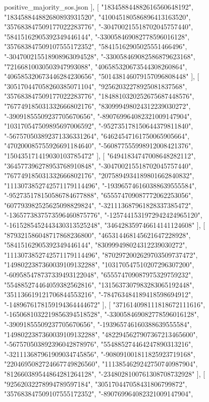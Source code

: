 \begin{filecontents*}[overwrite]{positive_majority_sos.json}
   ],
   [
    "183458844882616560648192",
    "183458844882680893931520",
    "410045180586896413163520",
    "357683847509177022283776",
    "-304700215518702045757440",
    "58415162905392349446144",
    "-330058469082778596016128",
    "357683847509107555172352",
    "58415162905025551466496",
    "-304700215518908963094528",
    "-330058469082586879623168",
    "72166810030503947993088",
    "406585320673544308260864",
    "406585320673446284230656",
    "501438146079157096808448"
   ],
   [
    "305170447058260385071104",
    "92562032278925081837568",
    "357683847509177022283776",
    "1848810320252675687448576",
    "767749185031332666802176",
    "830999498024312239030272",
    "-39091855509237705670656",
    "-890769964082321009147904",
    "103170547509895697006592",
    "-952735178150644379811840",
    "-567570503892371336331264",
    "64624547161750065905664",
    "470200085755926691184640",
    "-560877555998912008421376",
    "150435171419030103785472"
   ],
   [
    "64941834747008648282112",
    "364577396278953768910848",
    "-304700215518702045757440",
    "767749185031332666802176",
    "2075894934189801662840832",
    "1113073852742571179114496",
    "-193965746160388639555584",
    "-952735178150586784677888",
    "655574709087772062253056",
    "607793982525625098829824",
    "-321113687961828337385472",
    "-1365773837573596460875776",
    "-1257441531972942424965120",
    "-1615285452443430313525248",
    "346428359746614141124608"
   ],
   [
    "879321586048717868236800",
    "465314468145621647228928",
    "58415162905392349446144",
    "830999498024312239030272",
    "1113073852742571179114496",
    "8702972002629703509737472",
    "1498022387360039109132288",
    "103170547510207296307200",
    "-609585478737339493122048",
    "655574709087975329759232",
    "554885274464059382562816",
    "1315637307983283065192448",
    "351136619121706844553216",
    "-784763484189418598694912",
    "-1489676178159194364444672"
   ],
   [
    "371614098111818672111616",
    "-1650681032219856394518528",
    "-330058469082778596016128",
    "-39091855509237705670656",
    "-193965746160388639555584",
    "1498022387360039109132288",
    "4822945627907367213465600",
    "-567570503892396042878976",
    "554885274464247890313216",
    "-321113687961909034745856",
    "-908091001811825923719168",
    "2204695082724667749826560",
    "1113854629242750740987904",
    "812660389544864281264128",
    "-2348028100761308708732928"
   ],
   [
    "92562032278994789597184",
    "305170447058431806799872",
    "357683847509107555172352",
    "-890769964082321009147904",

\end{filecontents*}
